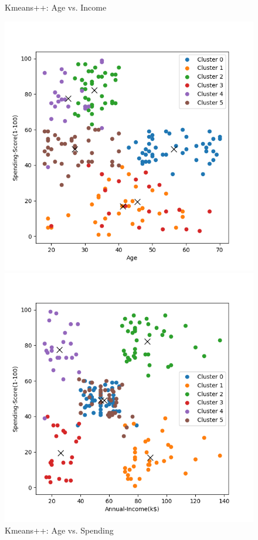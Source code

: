 \documentclass[8pt]{article}
\begin{document}
\begin{figure}[H]
\begin{minipage}{0.32\textwidth}
        \caption{Kmeans++: Age vs. Income}
        \label{fig: Age vs. Annual Income k6 pp com}
    \end{minipage}
    \hfill
    \begin{minipage}{0.32\textwidth}
        \centering
        \includegraphics[width=\textwidth]{./Prob4/out/task2_rand14/images/cluster_result_k6_0_2.png}
        \caption{Kmeans++: Age vs. Spending}
        \label{fig: Age vs. Spending Score k6 rand14 pp com}
    \end{minipage}
    \hfill
    \begin{minipage}{0.32\textwidth}
        \centering
        \includegraphics[width=\textwidth]{./Prob4/out/task2_rand14/images/cluster_result_k6_1_2.png}

\end{minipage}
\end{figure}
\end{document}
